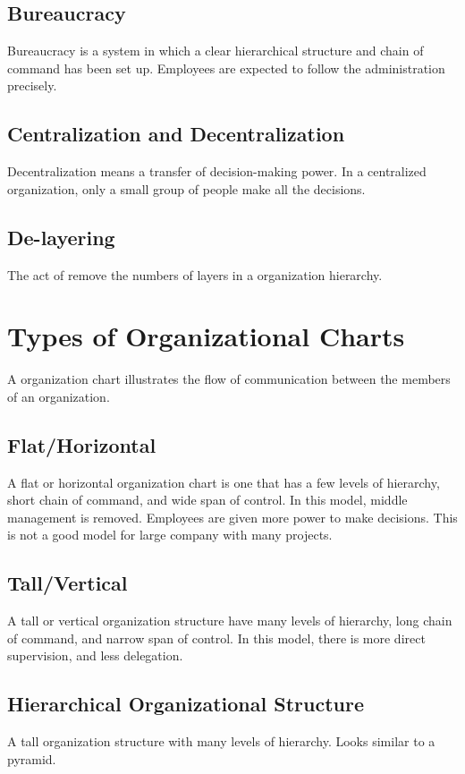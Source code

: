 \documentclass{standalone}
\begin{document}
\subsection{Bureaucracy}
Bureaucracy is a system in which a clear hierarchical structure and chain of command has been set up.
Employees are expected to follow the administration precisely.

\subsection{Centralization and Decentralization}
Decentralization means a transfer of decision-making power.
In a centralized organization, only a small group of people make all the decisions.

\subsection{De-layering}
The act of remove the numbers of layers in a organization hierarchy.

\section{Types of Organizational Charts}
A organization chart illustrates the flow of communication between the members of an organization.

\subsection{Flat/Horizontal}
A flat or horizontal organization chart is one that has a few levels of hierarchy, short chain of command, and wide span of control.
In this model, middle management is removed.
Employees are given more power to make decisions.
This is not a good model for large company with many projects.

\subsection{Tall/Vertical}
A tall or vertical organization structure have many levels of hierarchy, long chain of command, and narrow span of control.
In this model, there is more direct supervision, and less delegation.

\subsection{Hierarchical Organizational Structure}
A tall organization structure with many levels of hierarchy.
Looks similar to a pyramid.
\end{document}
